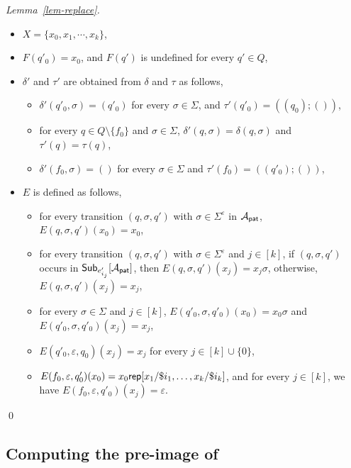 \begin{proof}[Lemma~\ref{lem-replace}]
\begin{itemize}
\item  $X = \{x_0, x_1, \cdots, x_k\}$,
%
\item $F(q'_0) = x_0$, and $F(q')$ is undefined for every $q' \in Q$,
%
\item $\delta'$ and $\tau'$ are obtained from $\delta$ and $\tau$ as follows,
\begin{itemize}
\item $\delta'(q'_0, \sigma) = (q'_0)$ for every $\sigma \in \Sigma$, and $\tau'(q'_0) = ((q_0); ())$,
%
\item for every $q \in Q \setminus \{f_0\}$ and $\sigma \in \Sigma$, $\delta'(q, \sigma) = \delta(q, \sigma)$ and $\tau'(q) = \tau(q)$, 
%
\item $\delta'(f_0, \sigma) = ()$ for every $\sigma \in \Sigma$ and $\tau'(f_0) = ((q'_0); ())$,
\end{itemize}
%
\item $E$ is defined as follows, 
\begin{itemize}
\item for every transition $(q, \sigma, q')$ with $\sigma \in \Sigma^\varepsilon$ in $\mathcal{A}_{\mathsf{pat}}$, $E(q, \sigma, q')(x_0) = x_0$,
%
\item for every transition $(q, \sigma, q')$ with $\sigma \in \Sigma^\varepsilon$ and $j \in [k]$,  if $(q, \sigma, q')$ occurs in ${\sf Sub}_{e'_{i_j}}[\mathcal{A}_{\mathsf{pat}}]$, then $E(q, \sigma, q')(x_j) = x_j\sigma$, otherwise, $E(q, \sigma, q')(x_j) = x_j$,
%
%
\item  for every $\sigma \in \Sigma$ and $j \in [k]$, $E(q'_0, \sigma, q'_0)(x_0) = x_0\sigma$ and $E(q'_0, \sigma, q'_0)$$(x_j) = x_j$, 

\item $E(q'_0, \varepsilon, q_0)(x_j) = x_j$ for every $j \in [k] \cup \{0\}$, 
%
\item $E(f_0, \varepsilon, q'_0)(x_0) = x_0 \mathsf{rep}[x_1/\$i_1,\ldots, x_k/\$i_k]$, and for every $j \in [k]$, we have $E(f_0, \varepsilon, q'_0)(x_j) = \varepsilon$.

\end{itemize}
%
\end{itemize}
\qed
\end{proof}


\subsection{Computing the pre-image of \PSST}\label{sec-pre-image}

